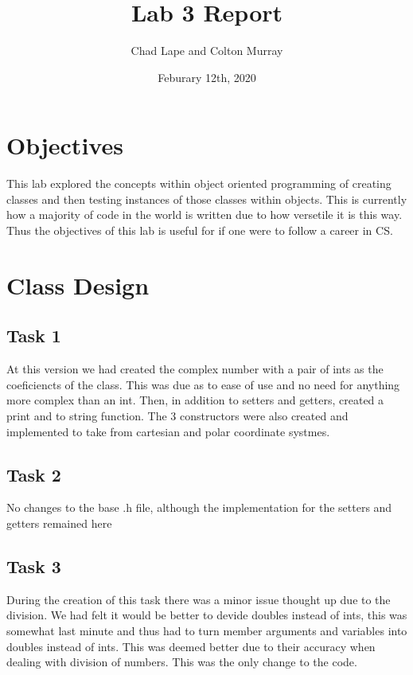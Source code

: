 \documentclass[11pt]{article}
\title{Lab 3 Report}
\author{Chad Lape and Colton Murray}
\date{Feburary 12th, 2020}
\begin{document}
\maketitle

\section{Objectives}
This lab explored the concepts within object oriented programming of creating classes and then testing instances of those classes within objects. This is currently how a majority of code in the world is written due to how versetile it is this way. Thus the objectives of this lab is useful for if one were to follow a career in CS.

\section{Class Design}
\subsection{Task 1}
At this version we had created the complex number with a pair of ints as the coeficiencts of the class. This was due as to ease of use and no need for anything more complex than an int. Then, in addition to setters and getters, created a print and to string function. The 3 constructors were also created and implemented to take from cartesian and polar coordinate systmes.
\subsection{Task 2}
No changes to the base .h file, although the implementation for the setters and getters remained here
\subsection{Task 3}
During the creation of this task there was a minor issue thought up due to the division. We had felt it would be better to devide doubles instead of ints, this was somewhat last minute and thus had to turn member arguments and variables into doubles instead of ints. This was deemed better due to their accuracy when dealing with division of numbers. This was the only change to the code.
\end{document}
